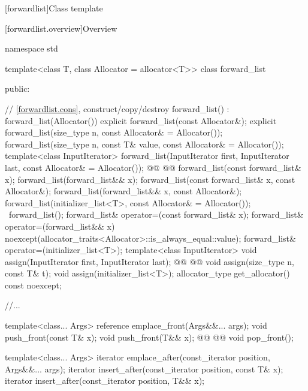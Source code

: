 \documentclass{wg21}
\begin{document}
[forwardlist]{Class template }

[forwardlist.overview]{Overview}

\begin{codeblock}
namespace std {
    template<class T, class Allocator = allocator<T>>
    class forward_list {
        public:

        // \ref{forwardlist.cons}, construct/copy/destroy
        forward_list() : forward_list(Allocator()) { }
        explicit forward_list(const Allocator&);
        explicit forward_list(size_type n, const Allocator& = Allocator());
        forward_list(size_type n, const T& value, const Allocator& = Allocator());
        template<class InputIterator>
        forward_list(InputIterator first, InputIterator last, const Allocator& = Allocator());
        @@
        @@
        forward_list(const forward_list& x);
        forward_list(forward_list&& x);
        forward_list(const forward_list& x, const Allocator&);
        forward_list(forward_list&& x, const Allocator&);
        forward_list(initializer_list<T>, const Allocator& = Allocator());
        ~forward_list();
        forward_list& operator=(const forward_list& x);
        forward_list& operator=(forward_list&& x)
        noexcept(allocator_traits<Allocator>::is_always_equal::value);
        forward_list& operator=(initializer_list<T>);
        template<class InputIterator>
        void assign(InputIterator first, InputIterator last);
        @@
        @@
        void assign(size_type n, const T& t);
        void assign(initializer_list<T>);
        allocator_type get_allocator() const noexcept;

        //...

        template<class... Args> reference emplace_front(Args&&... args);
        void push_front(const T& x);
        void push_front(T&& x);
        @@
        @@
        void pop_front();

        template<class... Args> iterator emplace_after(const_iterator position, Args&&... args);
        iterator insert_after(const_iterator position, const T& x);
        iterator insert_after(const_iterator position, T&& x);

}}
\end{codeblock}
\end{document}
